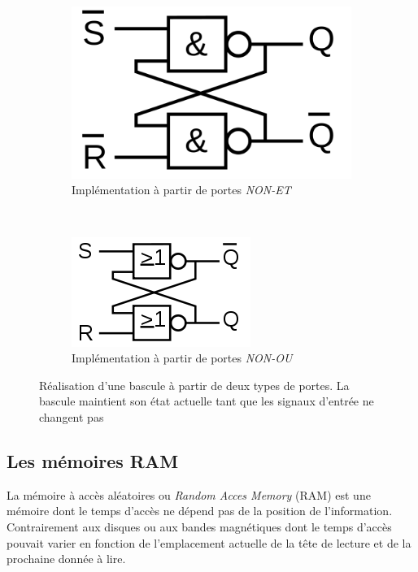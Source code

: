 \begin{figure}
    \begin{subfigure}[]{0.48\linewidth}\centering
        \includegraphics[width=0.60\linewidth]{images/processeurs_porte_bascule_nand.png}
        \caption{Implémentation à partir de portes \textit{NON-ET}}
        \label{pic_processeurs_porte_bascule_nand}
    \end{subfigure}
    ~ %
    \begin{subfigure}[]{0.48\linewidth}\centering
        \includegraphics[width=0.60\linewidth]{images/processeurs_porte_bascule_nor.png}
        \caption{Implémentation à partir de portes \textit{NON-OU}}
        \label{pic_processeurs_porte_bascule_nor}
    \end{subfigure}
    \caption{Réalisation d'une bascule à partir de deux types de portes. La bascule maintient son état actuelle tant que les signaux d'entrée ne changent pas}
    \label{fig_processeurs_porte_bascule}
\end{figure}


\subsection{Les mémoires RAM}

La mémoire à accès aléatoires ou \textit{Random Acces Memory} (RAM) est une mémoire dont le temps d'accès ne dépend pas de la position de l'information. Contrairement aux disques ou aux bandes magnétiques dont le temps d'accès pouvait varier en fonction de l'emplacement actuelle de la tête de lecture et de la prochaine donnée à lire.

